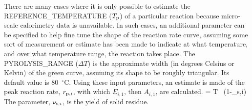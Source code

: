 \documentclass[11pt]{book}
\begin{document}
There are many cases where it is only possible to estimate the {\ct REFERENCE\_TEMPERATURE} ($T_{\rm p}$) of a particular reaction because micro-scale calorimetry data is unavailable. In such cases, an additional parameter can be specified to help fine tune the shape of the reaction rate curve, assuming some sort of measurement or estimate has been made to indicate at what temperature, and over what temperature range, the reaction takes place. The {\ct PYROLYSIS\_RANGE} ($\Delta T$) is the approximate width (in degrees Celsius or Kelvin) of the green curve, assuming its shape to be roughly triangular. Its default value is 80~$^\circ$C. Using these input parameters, an estimate is made of the peak reaction rate, $r_{{\rm p},i}$, with which $E_{i,1}$, then $A_{i,1}$, are calculated.
\be
    =  {\Delta T} \, (1-\nu_{{\rm s},i}) \label{r_p}
\ee
The parameter, $\nu_{{\rm s},i}$, is the yield of solid residue.
\end{document}
